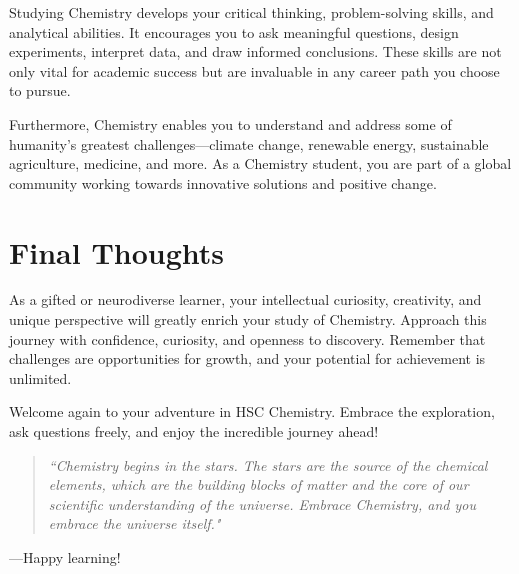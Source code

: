 
Studying Chemistry develops your critical thinking, problem-solving skills, and analytical abilities. It encourages you to ask meaningful questions, design experiments, interpret data, and draw informed conclusions. These skills are not only vital for academic success but are invaluable in any career path you choose to pursue.

Furthermore, Chemistry enables you to understand and address some of humanity's greatest challenges—climate change, renewable energy, sustainable agriculture, medicine, and more. As a Chemistry student, you are part of a global community working towards innovative solutions and positive change.

\section{Final Thoughts}
\FloatBarrier
\FloatBarrier
\FloatBarrier

As a gifted or neurodiverse learner, your intellectual curiosity, creativity, and unique perspective will greatly enrich your study of Chemistry. Approach this journey with confidence, curiosity, and openness to discovery. Remember that challenges are opportunities for growth, and your potential for achievement is unlimited.

Welcome again to your adventure in HSC Chemistry. Embrace the exploration, ask questions freely, and enjoy the incredible journey ahead!

\vspace{1cm}

\begin{quote}
\textit{``Chemistry begins in the stars. The stars are the source of the chemical elements, which are the building blocks of matter and the core of our scientific understanding of the universe. Embrace Chemistry, and you embrace the universe itself."}
\end{quote}

\vspace{1cm}

—Happy learning!